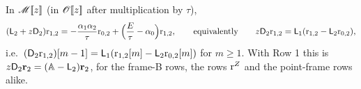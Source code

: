 \begin{thm}
\label{thm:lea-row2reg}
In $\mathscr{M}[\![ z ]\!]$ (in $\mathscr{O}[\![ z ]\!]$ after multiplication by $\tau$),
\begin{equation}
\label{eq:lea-row2reg}
(\mathsf{L}_2 + z\mathsf{D}_2)\mathrm{r}_{1,2} = -\frac{\alpha_1\alpha_2}{\tau}\mathrm{r}_{0,2} + \Bigl(\frac{E}{\tau}-\alpha_0\Bigr)\mathrm{r}_{1,2},\qquad\text{equivalently}\qquad z\mathsf{D}_2\mathrm{r}_{1,2} = \mathsf{L}_1(\mathrm{r}_{1,2} - \mathsf{L}_2\mathrm{r}_{0,2}),
\end{equation}
i.e.\ $(\mathsf{D}_2\mathrm{r}_{1,2})[m-1] = \mathsf{L}_1(\mathrm{r}_{1,2}[m] - \mathsf{L}_2\mathrm{r}_{0,2}[m])$ for $m\geq 1$. With Row 1 this is $z\mathsf{D}_2\mathbf{r}_2 = (\mathbb{A}-\mathsf{L}_2)\mathbf{r}_2$, for the frame-B rows, the rows $\mathrm{r}^{Z}$ and the point-frame rows alike.
\end{thm}

